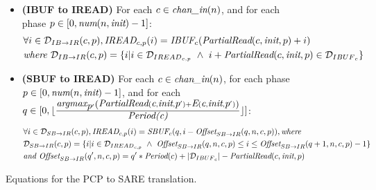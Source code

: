 \begin{figure}[p]
{\begin{minipage}{6.3in}
\begin{itemize}
\begin{align}
\label{swrite2sbuf}
&\forall (i,j) \in {\cal D}_{SW {\small \rightarrow} SB}(c,p,q),
\mt{SBUF}_{c}(i,j) = \nonumber\\
&~~~~~~\mt{SWRITE}_{c, p}(i, q,
                     j - \mt{Offset}_{SW {\small \rightarrow} SB}(q,n,c,p)),
\mt{where } \\&{\cal D}_{SW {\small \rightarrow} SB}(c,p,q) = 
  {\cal D}_{{SBUF}_{c}} \cap 
  \{ (i,j) | \mt{Offset}_{SW {\small \rightarrow} SB}(q,n,c,p) \le j
             \le \mt{Offset}_{SW {\small \rightarrow} SB}(q,n,c,p+1) - 1 \} \nonumber\\\nonumber
&\mt{and } \mt{Offset}_{SW {\small \rightarrow} SB}(q,n,c,p') = q*\mt{TotalWrite}(n,c,\mt{steady}) + \mt{PartialWrite}(c,\mt{steady},p'))
\end{align}
%
\item {\bf(IBUF to IREAD)} For each $c \in \mbox{\it chan\_in}(n)$, and for each phase $p \in
[0, \mbox{\it num}(n, \mbox{\it init})-1]$:
\begin{align}
\label{ibuf2iread}
&\forall i \in {\cal D}_{IB {\small \rightarrow} IR}(c,p), 
\mbox{\it IREAD}_{c, p}(i) = \mbox{\it IBUF}_{c}(\mbox{\it PartialRead}(c, \mbox{\it init}, p) + i) \\ \nonumber
&\mbox{\it where }{\cal D}_{IB {\small \rightarrow} IR}(c,p) = 
  \{ i | i \in {\cal D}_{{IREAD}_{c,p}} ~\wedge~ 
         i + \mbox{\it PartialRead}(c, \mbox{\it init}, p) \in {\cal D}_{{IBUF}_{c}} \}
\end{align}
%
\item {\bf(SBUF to IREAD)} For each $c \in \mbox{\it chan\_in}(n)$, for each phase $p \in [0,
\mbox{\it num}(n, \mbox{\it init})-1]$, and for each \\$q \in [0, \lfloor
\frac{\mbox{\it argmax}_{\mbox{\it p}'} \left( \mbox{\it PartialRead}(\mbox{\it c}, \mbox{\it init},
\mbox{\it p}') + \mbox{\it E}(\mbox{\it c}, \mbox{\it init}, \mbox{\it p}') \right)
}{\mbox{\it Period(c)}} \rfloor ]$:
\begin{align}
\label{sbuf2iread}
&\forall i \in {\cal D}_{SB {\small \rightarrow} IR}(c,p), 
\mbox{\it IREAD}_{c,p}(i) = 
    \mbox{\it SBUF}_{c}(q,
      i - \mbox{\it Offset}_{SB {\small \rightarrow} IR}(q,n,c,p)), \mbox{\it where } \\ \nonumber
&{\cal D}_{SB {\small \rightarrow} IR}(c,p) = 
  \{ i | i \in {\cal D}_{{IREAD}_{c,p}} ~\wedge~
         \mbox{\it Offset}_{SB {\small \rightarrow} IR}(q,n,c,p)
         \le i \le
         \mbox{\it Offset}_{SB {\small \rightarrow} IR}(q+1,n,c,p) - 1 \} \\ \nonumber
&\mbox{\it and }\mbox{\it Offset}_{SB {\small \rightarrow} IR}(q',n,c,p) = 
  q' * \mbox{\it Period}(c) + |{\cal D}_{{IBUF}_c}| - \mbox{\it PartialRead}(c,\mbox{\it init},p)
\end{align}
%
\end{itemize}
\end{minipage}}
\caption{Equations for the PCP to SARE translation.
\protect\label{fig:pcptosare2}}
\end{figure}


